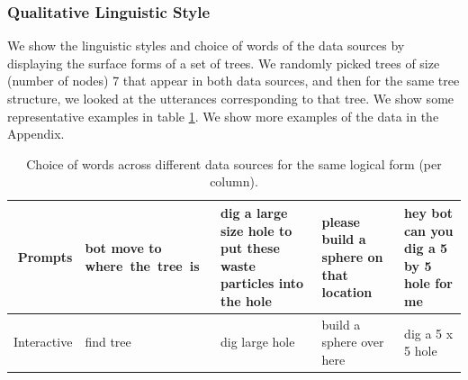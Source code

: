 \subsubsection{Qualitative Linguistic Style} We show the linguistic styles and choice of words of the data sources by displaying the surface forms of a set of trees. We randomly picked trees of size (number of nodes) 7 that appear in both data sources, and then for the same tree structure, we looked at the utterances corresponding to that tree. We show some representative examples in table \ref{tab:ling_1}.  We show more examples of the data in the Appendix.


\begin{table}
\center
\small
\begin{tabular}{r  m{2.0cm} m{4.2cm} m{3.0cm} m{3.0cm}}
\toprule
Prompts     & bot move to \mbox{where the tree is}& dig a large size hole to put these waste particles into the hole   & please build a sphere on that location       	& hey bot can you dig a 5 by 5 hole for me   \\  \midrule%
Interactive & find tree       	& dig large hole    & build a sphere over here    & dig a 5 x 5 hole  \\ \bottomrule %
\end{tabular}
\caption{Choice of words across different data sources for the same logical form (per column).}
\label{tab:ling_1}
\end{table}







